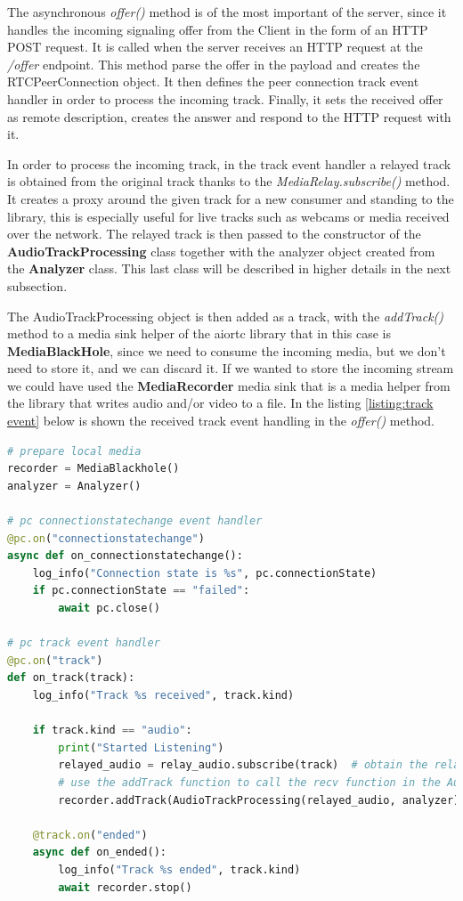 \documentclass[../main.tex]{subfiles}
\begin{document}
The asynchronous \textit{offer()} method is  of the most important of the server, since it handles the incoming signaling offer from the Client in the form of an HTTP POST request. It is called when the server receives an HTTP request at the \textit{/offer} endpoint. This method parse the offer in the payload and creates the RTCPeerConnection object. It then defines the peer connection track event handler in order to process the incoming track. Finally, it sets the received offer as remote description, creates the answer and respond to the HTTP request with it.

In order to process the incoming track, in the track event handler a relayed track is obtained from the original track thanks to the \textit{MediaRelay.subscribe()} method. It creates a proxy around the given track for a new consumer and standing to the library, this is especially useful for live tracks such as webcams or media received over the network. The relayed track is then passed to the constructor of the \textbf{AudioTrackProcessing} class together with the analyzer object created from the \textbf{Analyzer} class. This last class will be described in higher details in the next subsection.

The AudioTrackProcessing object is then added as a track, with the \textit{addTrack()} method to a media sink helper of the aiortc library that in this case is \textbf{MediaBlackHole}, since we need to consume the incoming media, but we don't need to store it, and we can discard it. If we wanted to store the incoming stream we could have used the \textbf{MediaRecorder} media sink that is a media helper from the library that writes audio and/or video to a file. In the listing \ref{listing:track event} below is shown the received track event handling in the \textit{offer()} method.

\begin{lstlisting}[language=Python, caption=Track event handling]
# prepare local media
recorder = MediaBlackhole()
analyzer = Analyzer()

# pc connectionstatechange event handler
@pc.on("connectionstatechange")
async def on_connectionstatechange():
    log_info("Connection state is %s", pc.connectionState)
    if pc.connectionState == "failed":
        await pc.close()

# pc track event handler
@pc.on("track")
def on_track(track):
    log_info("Track %s received", track.kind)

    if track.kind == "audio":
        print("Started Listening")
        relayed_audio = relay_audio.subscribe(track)  # obtain the relayed track
        # use the addTrack function to call the recv function in the AudioTrackProcessing class on the relayed track
        recorder.addTrack(AudioTrackProcessing(relayed_audio, analyzer))

    @track.on("ended")
    async def on_ended():
        log_info("Track %s ended", track.kind)
        await recorder.stop()
\end{lstlisting}
\label{listing:track event}
\end{document}
